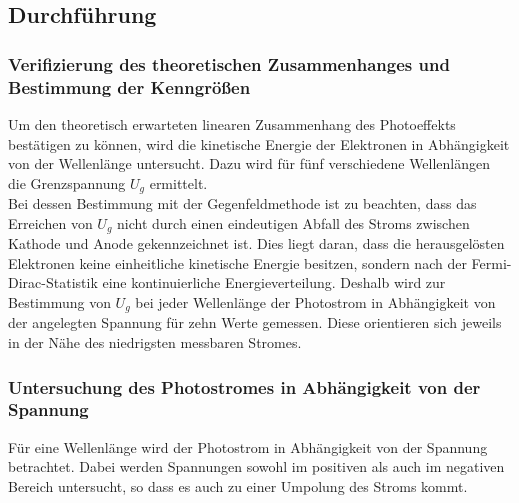 \subsection{Durchführung}
\label{sec:durchführung}

\subsubsection{Verifizierung des theoretischen Zusammenhanges und Bestimmung der Kenngrößen}
Um den theoretisch erwarteten linearen Zusammenhang des Photoeffekts bestätigen zu können, wird die kinetische Energie der Elektronen in Abhängigkeit von der Wellenlänge untersucht.
Dazu wird für fünf verschiedene Wellenlängen die Grenzspannung $U_g$ ermittelt.\\
Bei dessen Bestimmung mit der Gegenfeldmethode ist zu beachten, dass das Erreichen von $U_g$ nicht durch einen eindeutigen Abfall des Stroms zwischen Kathode und Anode gekennzeichnet ist.
Dies liegt daran, dass die herausgelösten Elektronen keine einheitliche kinetische Energie besitzen, sondern nach der Fermi-Dirac-Statistik eine kontinuierliche Energieverteilung.
Deshalb wird zur Bestimmung von $U_g$ bei jeder Wellenlänge der Photostrom in Abhängigkeit von der angelegten Spannung für zehn Werte gemessen.
Diese orientieren sich jeweils in der Nähe des niedrigsten messbaren Stromes.

\subsubsection{Untersuchung des Photostromes in Abhängigkeit von der Spannung}
Für eine Wellenlänge wird der Photostrom in Abhängigkeit von der Spannung betrachtet.
Dabei werden Spannungen sowohl im positiven als auch im negativen Bereich untersucht, so dass es auch zu einer Umpolung des Stroms kommt.
